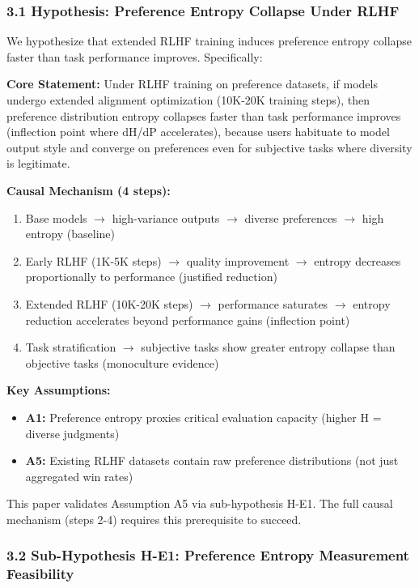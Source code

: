 
\subsubsection{3.1 Hypothesis: Preference Entropy Collapse Under RLHF}

We hypothesize that extended RLHF training induces preference entropy collapse faster than task performance improves. Specifically:

\textbf{Core Statement:} Under RLHF training on preference datasets, if models undergo extended alignment optimization (10K-20K training steps), then preference distribution entropy collapses faster than task performance improves (inflection point where dH/dP accelerates), because users habituate to model output style and converge on preferences even for subjective tasks where diversity is legitimate.

\textbf{Causal Mechanism (4 steps):}
\begin{enumerate}
\item Base models $\rightarrow$ high-variance outputs $\rightarrow$ diverse preferences $\rightarrow$ high entropy (baseline)
\item Early RLHF (1K-5K steps) $\rightarrow$ quality improvement $\rightarrow$ entropy decreases proportionally to performance (justified reduction)
\item Extended RLHF (10K-20K steps) $\rightarrow$ performance saturates $\rightarrow$ entropy reduction accelerates beyond performance gains (inflection point)
\item Task stratification $\rightarrow$ subjective tasks show greater entropy collapse than objective tasks (monoculture evidence)
\end{enumerate}

\textbf{Key Assumptions:}
\begin{itemize}
\item \textbf{A1:} Preference entropy proxies critical evaluation capacity (higher H = diverse judgments)
\item \textbf{A5:} Existing RLHF datasets contain raw preference distributions (not just aggregated win rates)
\end{itemize}

This paper validates Assumption A5 via sub-hypothesis H-E1. The full causal mechanism (steps 2-4) requires this prerequisite to succeed.

\subsubsection{3.2 Sub-Hypothesis H-E1: Preference Entropy Measurement Feasibility}

